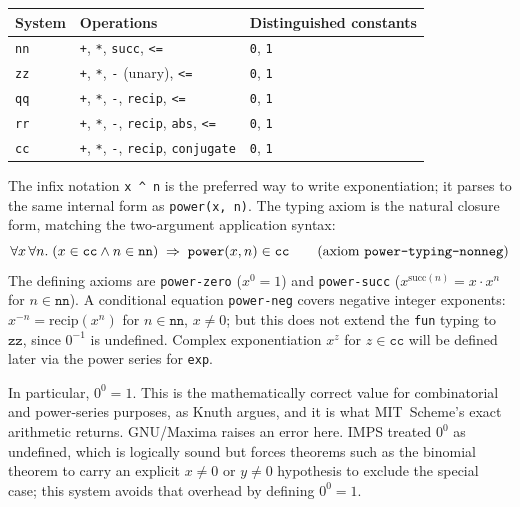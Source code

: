 \begin{center}
\begin{tabular}{lll}
\toprule
System & Operations & Distinguished constants \\
\midrule
\texttt{nn} &
  \texttt{+}, \texttt{*}, \texttt{succ}, \texttt{<=} &
  \texttt{0}, \texttt{1} \\[3pt]
\texttt{zz} &
  \texttt{+}, \texttt{*}, \texttt{-} (unary), \texttt{<=} &
  \texttt{0}, \texttt{1} \\[3pt]
\texttt{qq} &
  \texttt{+}, \texttt{*}, \texttt{-}, \texttt{recip}, \texttt{<=} &
  \texttt{0}, \texttt{1} \\[3pt]
\texttt{rr} &
  \texttt{+}, \texttt{*}, \texttt{-}, \texttt{recip}, \texttt{abs}, \texttt{<=} &
  \texttt{0}, \texttt{1} \\[3pt]
\texttt{cc} &
  \texttt{+}, \texttt{*}, \texttt{-}, \texttt{recip}, \texttt{conjugate} &
  \texttt{0}, \texttt{1} \\
\bottomrule
\end{tabular}
\end{center}

\begin{remark}\label{remark:27135-34942-842417}
%
The infix notation \texttt{x \^{} n} is the preferred way to write
exponentiation; it parses to the same internal form as
\texttt{power(x, n)}.  The typing axiom is the natural closure form,
matching the two-argument application syntax:
\[
  \forall x\,\forall n.\;
    (x \in \mathtt{cc} \land n \in \mathtt{nn})
    \;\Rightarrow\; \texttt{power}(x,n) \in \mathtt{cc}
  \qquad\text{(axiom \texttt{power-typing-nonneg})}
\]
The defining axioms are \texttt{power-zero} ($x^0 = 1$) and
\texttt{power-succ} ($x^{\mathrm{succ}(n)} = x \cdot x^n$ for
$n \in \mathtt{nn}$).  A conditional equation \texttt{power-neg}
covers negative integer exponents: $x^{-n} = \mathrm{recip}(x^n)$
for $n \in \mathtt{nn}$, $x \neq 0$; but this does not extend the
\texttt{fun} typing to $\mathtt{zz}$, since $0^{-1}$ is undefined.
Complex exponentiation $x^z$ for $z \in \mathtt{cc}$ will be defined
later via the power series for \texttt{exp}.
%
\end{remark}
%
\begin{remark}\label{remark:27135-34995-146430}
%
In particular, $0^0 = 1$.  This is the mathematically correct value
for combinatorial and power-series purposes, as Knuth argues, and it is
what MIT~Scheme's exact arithmetic returns.  GNU/Maxima raises an error
here.  IMPS treated $0^0$ as undefined, which is logically sound but
forces theorems such as the binomial theorem to carry an explicit
$x \neq 0$ or $y \neq 0$ hypothesis to exclude the special case;
this system avoids that overhead by defining $0^0 = 1$.
%
\end{remark}

